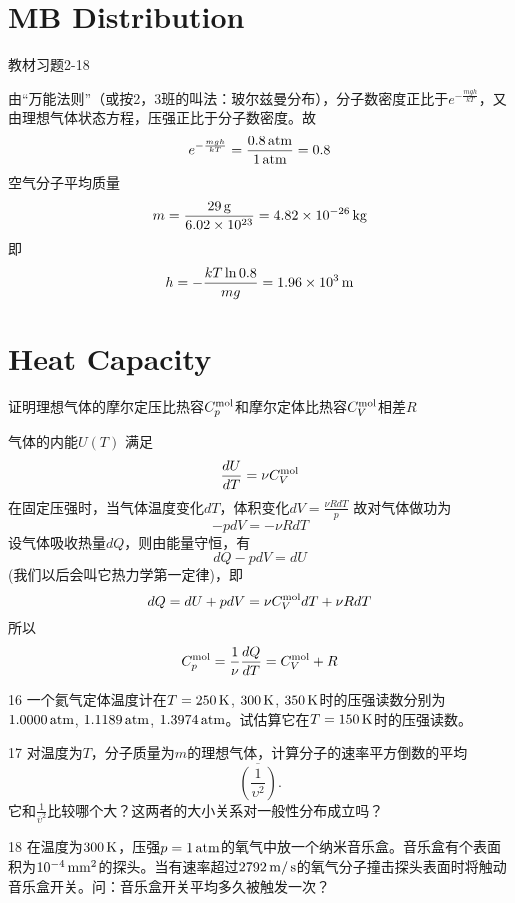 \documentclass[CJK]{beamer}
\begin{document}
\section{MB Distribution}

\begin{frame}
\bch
{\blue 教材习题2-18}

\skipline

{\scriptsize
由“万能法则”（或按2，3班的叫法：玻尔兹曼分布），分子数密度正比于$e^{-\frac{mgh}{kT}}$，又由理想气体状态方程，压强正比于分子数密度。故
$$ e^{-\frac{mgh}{kT}} = \frac{0.8\,\mathrm{atm}}{1\,\mathrm{atm}} = 0.8$$
空气分子平均质量
$$m = \frac{29\,\mathrm{g}}{6.02\times 10^{23}} = 4.82\times 10^{-26}\,\mathrm{kg}$$
即
$$h = -\frac{kT\ln 0.8}{mg} = 1.96\times 10^3 \,\mathrm{m}$$ 
}
\ech
\end{frame}

\section{Heat Capacity}


\begin{frame}
\bch
{\blue 证明理想气体的摩尔定压比热容$C_p^{\rm mol}$和摩尔定体比热容$C_V^{\rm mol}$相差$R$}

\skipline
{\scriptsize
气体的内能$U(T)$ 满足
$$\frac{dU}{dT} = \nu C_V^{\rm mol}$$
在固定压强时，当气体温度变化$dT$，体积变化$dV = \frac{ \nu R dT}{p}$
故对气体做功为
$$-p dV = - \nu R dT$$
设气体吸收热量$dQ$，则由能量守恒，有
$$dQ - pdV = dU$$
(我们以后会叫它热力学第一定律)，即
$$dQ = dU + pdV =  \nu C_V^{\rm mol}dT + \nu RdT$$
所以
$$C_p^{\rm mol} = \frac{1}{\nu} \frac{dQ}{dT} = C_V^{\rm mol} + R$$

}
\ech
\end{frame}

\begin{frame}
\bch
\bitem
\item[16]{一个氦气定体温度计在$T = 250\,\mathrm{K}$, $300\,\mathrm{K}$, $350\,\mathrm{K}$时的压强读数分别为$1.0000\,\mathrm{atm}$, $1.1189\,\mathrm{atm}$, $1.3974\,\mathrm{atm}$。试估算它在$T=150\,\mathrm{K}$时的压强读数。}
\item[17]{对温度为$T$，分子质量为$m$的理想气体，计算分子的速率平方倒数的平均$$\overline{\left(\frac{1}{\upsilon^2}\right)}.$$它和$\frac{1}{\overline{\upsilon}^2}$比较哪个大？这两者的大小关系对一般性分布成立吗？}
\item[18]{在温度为$300\,\mathrm{K}$，压强$p = 1\,\mathrm{atm}$的氧气中放一个纳米音乐盒。音乐盒有个表面积为$10^{-4}\,\mathrm{mm}^2$的探头。当有速率超过$2792\,\mathrm{m}/\,\mathrm{s}$的氧气分子撞击探头表面时将触动音乐盒开关。问：音乐盒开关平均多久被触发一次？}
\eitem
\ech
\end{frame}
\end{document}
